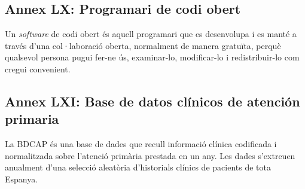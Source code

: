 \documentclass[a4paper,12pt]{article}
\begin{document}
\subsection*{Annex LX: Programari de codi obert}
Un \textit{software} de codi obert és aquell programari que es desenvolupa i es manté a través d'una col·laboració oberta, normalment de manera gratuïta, perquè qualsevol persona pugui fer-ne ús, examinar-lo, modificar-lo i redistribuir-lo com cregui convenient.
\subsection*{Annex LXI: Base de datos clínicos de atención primaria}
La BDCAP és  una base de dades que recull informació clínica codificada i normalitzada sobre l'atenció  primària prestada en un any. Les dades s'extreuen anualment d'una selecció aleatòria d'historials clínics de pacients de tota Espanya.
\end{document}
